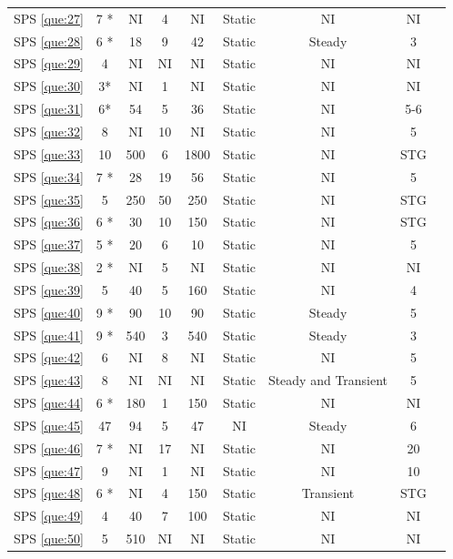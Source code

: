 \documentclass[sensors,review,accept,moreauthors,pdftex]{Definitions/mdpi}
\begin{document}
\begin{table}[H]
\begin{tabular}{ccccccccc}
	SPS \ref{que:27}	&	7 *	&	NI	&	4	&	NI	&	Static	&	NI	&	NI	\\	
	SPS \ref{que:28}	&	6 *	&	18	&	9	&	42	&	Static	&	Steady	&	3	\\	
	SPS \ref{que:29}	&	4	&	NI	&	NI	&	NI	&	Static	&	NI	&	NI	\\	
	SPS \ref{que:30}	&	3*	&	NI	&	1	&	NI	&	Static	&	NI	&	NI	\\	
	SPS \ref{que:31}	&	6*	&	54	&	5	&	36	&	Static	&	NI	&	5-6	\\	
	SPS \ref{que:32}	&	8	&	NI	&	10	&	NI	&	Static	&	NI	&	5	\\	
	SPS \ref{que:33}	&	10	&	500	&	6	&	1800	&	Static	&	NI	&	STG	\\	
	SPS \ref{que:34}	&	7 *	&	28	&	19	&	56	&	Static	&	NI	&	5	\\	
	SPS \ref{que:35}	&	5	&	250	&	50	&	250	&	Static	&	NI	&	STG	\\	
	SPS \ref{que:36}	&	6 *	&	30	&	10	&	150	&	Static	&	NI	&	STG	\\	
	SPS \ref{que:37}	&	5 *	&	20	&	6	&	10	&	Static	&	NI	&	5	\\	
	SPS \ref{que:38}	&	2 *	&	NI	&	5	&	NI	&	Static	&	NI	&	NI	\\	
	SPS \ref{que:39}	&	5	&	40	&	5	&	160	&	Static	&	NI	&	4	\\	
	SPS \ref{que:40}	&	9 *	&	90	&	10	&	90	&	Static	&	Steady	&	5	\\	
	SPS \ref{que:41}	&	9 *	&	540	&	3	&	540	&	Static	&	Steady	&	3	\\	
	SPS \ref{que:42}	&	6	&	NI	&	8	&	NI	&	Static	&	NI	&	5	\\	
	SPS \ref{que:43}	&	8	&	NI	&	NI	&	NI	&	Static	&	Steady and Transient	&	5	\\	
	SPS \ref{que:44}	&	6 *	&	180	&	1	&	150	&	Static	&	NI	&	NI	\\	
	SPS \ref{que:45}	&	47	&	94	&	5	&	47	&	NI	&	Steady	&	6	\\	
	SPS \ref{que:46}	&	7 *	&	NI	&	17	&	NI	&	Static	&	NI	&	20	\\	
	SPS \ref{que:47}	&	9	&	NI	&	1	&	NI	&	Static	&	NI	&	10	\\	
	SPS \ref{que:48}	&	6 *	&	NI	&	4	&	150	&	Static	&	Transient	&	STG	\\	
	SPS \ref{que:49}	&	4	&	40	&	7	&	100	&	Static	&	NI	&	NI	\\	
	SPS \ref{que:50}	&	5	&	510	&	NI	&	NI	&	Static	&	NI	&	NI	\\	
		\bottomrule
		\end{tabular}
\end{table}
\end{document}
